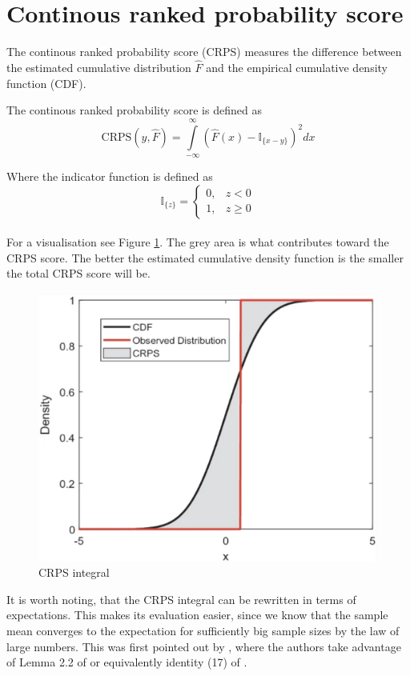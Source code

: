 \section{Continous ranked probability score}
The continous ranked probability score (CRPS) measures the difference between the estimated cumulative distribution $\hat{F}$ and the empirical cumulative density function (CDF).
\begin{definition}\label{def_crps}
    The continous ranked probability score is defined as
    $$
    \mathrm{CRPS}(y, \hat{F})=\int\limits_{-\infty}^{\infty}\left(\hat{F}(x)-\mathbb{I}_{\{x-y\}} \right)^2 dx
    $$
\end{definition}
Where the indicator function is defined as 
    $$\mathbb{I}_{\{z\}}=
\begin{cases}
0, & z<0\\
1, & z \geq 0
\end{cases}$$
\\
For a visualisation see Figure \ref{fig:crps}. The grey area is what contributes toward the CRPS score.
The better the estimated cumulative density function is the smaller the total CRPS score will be.
\begin{figure}
    \includegraphics[width=\textwidth]{images/crps.png}
    \caption{CRPS integral \cite{haben2023core}}
    \label{fig:crps}
  \end{figure}
It is worth noting, that the CRPS integral can be rewritten in terms of expectations. This makes its evaluation easier, since we know that the sample mean converges to the expectation for sufficiently big sample sizes by the law of large numbers. This was first pointed out by \cite{proper_scores}, where the authors take advantage of Lemma 2.2 of \cite{new_multi_test2} or equivalently identity (17) of \cite{new_multi_tes1}.

